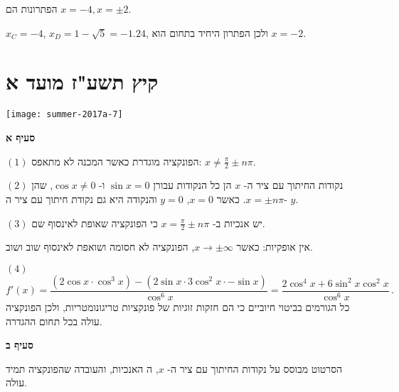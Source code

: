 \vspace{-2ex}

הפתרונות הם
$x=-4,x=\pm 2$.

$x_C=-4$,
$x_D=1-\sqrt{5}=-1.24$,
ולכן הפתרון היחיד בתחום הוא 
$x=-2$.


\np


\section{קיץ תשע"ז מועד א}

\begin{center}
\texttt{[image: summer-2017a-7]}
\end{center}

\vspace{-2ex}

\textbf{סעיף א}

$(1)$
הפונקציה מוגדרת כאשר המכנה לא מתאפס:
$x \neq \frac{\pi}{2} \pm n\pi$.

$(2)$
נקודות החיתוך עם ציר ה-%
$x$
הן כל הנקודות עבורן
$\sin x = 0$
ו-%
$\cos x \neq 0$,
שהן 
$x=\pm n\pi$.
כאשר 
$x=0$,
$y=0$
והנקודה היא גם נקודת חיתוך עם ציר ה-%
$y$.

$(3)$
יש
\asms{}
אנכיות ב-%
$x=\frac{\pi}{2} \pm n\pi$
כי הפונקציה שאופת לאינסוף שם.

אין 
\asm{}
אופקיות: כאשר
$x\rightarrow \pm \infty$,
הפונקציה לא חסומה ושואפת לאינסוף שוב ושוב.

$(4)$
\[
f'(x)=\frac{(2\cos x\cdot\cos^3 x) - (2\sin x \cdot 3\cos^2 x \cdot -\sin x)}{\cos^6 x}=\frac{2\cos^4 x + 6\sin^2 x\cos^2 x}{\cos^6 x}\,.
\]
כל הגורמים בביטוי חיוביים כי הם חזקות זוגיות של פונקציות טריגונומטריות, ולכן הפונקציה עולה בכל תחום ההגדרה.

\np

\textbf{סעיף ב}

הסרטוט מבוסס על נקודות החיתוך עם ציר ה-%
$x$,
ה%
\asms{}
האנכיות, והעובדה שהפונקציה תמיד עולה.

\begin{center}
\end{center}


